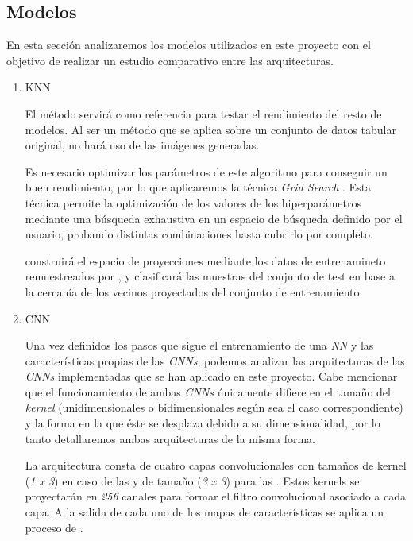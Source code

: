     \subsection{Modelos}


        En esta sección analizaremos los modelos utilizados en este proyecto con el objetivo de realizar un estudio comparativo entre las arquitecturas.


        \begin{enumerate}

            \item KNN

                El método  servirá como referencia para testar el rendimiento del resto de modelos. Al ser un método que se aplica sobre un conjunto de datos tabular original, no hará uso de las imágenes generadas.

                Es necesario optimizar los parámetros de este algoritmo para conseguir un buen rendimiento, por lo que aplicaremos la técnica \textit{Grid Search} \cite{GridSearchSklearnLibrary}. Esta técnica permite la optimización de los valores de los hiperparámetros mediante una búsqueda exhaustiva en un espacio de búsqueda definido por el usuario, probando distintas combinaciones hasta cubrirlo por completo. 

                 construirá el espacio de proyecciones mediante los datos de entrenamineto remuestreados por , y clasificará las muestras del conjunto de test en base a la cercanía de los vecinos proyectados del conjunto de entrenamiento.


            \item CNN

                Una vez definidos los pasos que sigue el entrenamiento de una \textit{NN} y las características propias de las \textit{CNNs}, podemos analizar las arquitecturas de las \textit{CNNs} implementadas que se han aplicado en este proyecto. Cabe mencionar que el funcionamiento de ambas \textit{CNNs} únicamente difiere en el tamaño del \textit{kernel} (unidimensionales o bidimensionales según sea el caso correspondiente) y la forma en la que éste se desplaza debido a su dimensionalidad, por lo tanto detallaremos ambas arquitecturas de la misma forma.

                La arquitectura consta de cuatro capas convolucionales con tamaños de kernel (\textit{1 x 3}) en caso de las  y de tamaño (\textit{3 x 3}) para las . Estos kernels se proyectarán en \textit{256} canales para formar el filtro convolucional asociado a cada capa. A la salida de cada uno de los mapas de características se aplica un proceso de .


\end{enumerate}
